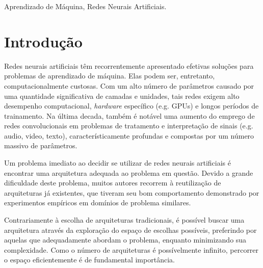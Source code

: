 \documentclass[twoside,conference,a4paper,12px]{IEEEtran}
\begin{document}
\begin{IEEEkeywords}
  Aprendizado de Máquina, Redes Neurais Artificiais.
\end{IEEEkeywords}


\section{Introdução}


Redes neurais artificiais têm recorrentemente apresentado efetivas soluções para problemas de aprendizado de máquina. Elas podem ser, entretanto, computacionalmente custosas. Com um alto número de parâmetros causado por uma quantidade significativa de camadas e unidades, tais redes exigem alto desempenho computacional, \textit{hardware} específico (e.g. GPUs) e longos períodos de trainamento. Na última decada, também é notável uma aumento do emprego de redes convolucionais em problemas de tratamento e interpretação de sinais (e.g. audio, video, texto), característicamente profundas e compostas por um número massivo de parâmetros.

Um problema imediato ao decidir se utilizar de redes neurais artificiais é encontrar uma arquitetura adequada ao problema em questão. Devido a grande dificuldade deste problema, muitos autores recorrem à reutilização de arquiteturas já existentes, que tiveram seu bom comportamento demonstrado por experimentos empíricos em domínios de problema similares.

Contrariamente à escolha de arquiteturas tradicionais, é possível buscar uma arquitetura através da exploração do espaço de escolhas possíveis, preferindo por aquelas que adequadamente abordam o problema, enquanto minimizando sua complexidade. Como o número de arquiteturas é possívelmente infinito, percorrer o espaço eficientemente é de fundamental importância.
\end{document}
